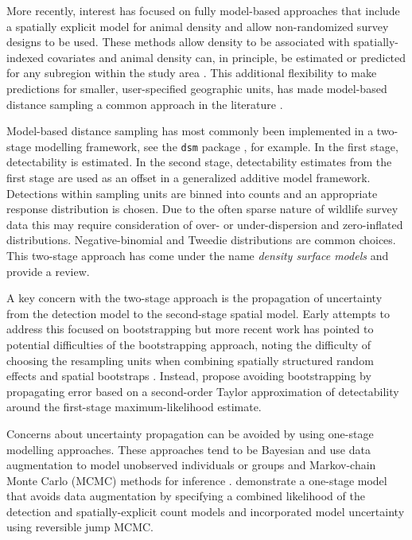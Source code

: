 \documentclass{stylefile16/statsoc}
\begin{document}
More recently, interest has focused on fully model-based approaches that include a spatially explicit model for animal density and allow non-randomized survey designs to be used.  These methods allow density to be associated with spatially-indexed covariates and animal density can, in principle, be estimated or predicted for any subregion within the study area \citep{johnson_model-based_2010, miller_spatial_2013, buckland_model-based_2016}.  This additional flexibility to make predictions for smaller, user-specified geographic units, has made model-based distance sampling a common approach in the literature \citep{garciabaron_modelling_2019, herr_aerial_2019, breen_new_2017, williams_chilean_2011, stokes_monitoring_2010, williams_modeling_2006}.

Model-based distance sampling has most commonly been implemented in a two-stage modelling framework, see the \texttt{dsm} package \citep{miller_spatial_2013}, for example.  In the first stage, detectability is estimated.  In the second stage, detectability estimates from the first stage are used as an offset in a generalized additive model framework.  Detections within sampling units are binned into counts and an appropriate response distribution is chosen.  Due to the often sparse nature of wildlife survey data this may require consideration of over- or under-dispersion and zero-inflated distributions.  Negative-binomial and Tweedie distributions are common choices.  This two-stage approach has come under the name \textit{density surface models} and \cite{miller_spatial_2013} provide a review.

A key concern with the two-stage approach is the propagation of uncertainty from the detection model to the second-stage spatial model.  Early attempts to address this focused on bootstrapping \citep{lahiri_resampling_2003, hedley_spatial_2004} but more recent work has pointed to potential difficulties of the bootstrapping approach, noting the difficulty of choosing the resampling units when combining spatially structured random effects and spatial bootstraps \citep{bravington_reliable_2018-1, williams_chilean_2011}. Instead, \cite{bravington_reliable_2018-1} propose avoiding bootstrapping by propagating error based on a second-order Taylor approximation of detectability around the first-stage maximum-likelihood estimate.

Concerns about uncertainty propagation can be avoided by using one-stage modelling approaches.  These approaches tend to be Bayesian and use data augmentation to model unobserved individuals or groups and Markov-chain Monte Carlo (MCMC) methods for inference \citep{royle_hierarchical_2008, schmidt_using_2012}.  \citet{oedekoven_bayesian_2014} demonstrate a one-stage model that avoids data augmentation by specifying a combined likelihood of the detection and spatially-explicit count models and incorporated model uncertainty using reversible jump MCMC.
\end{document}
